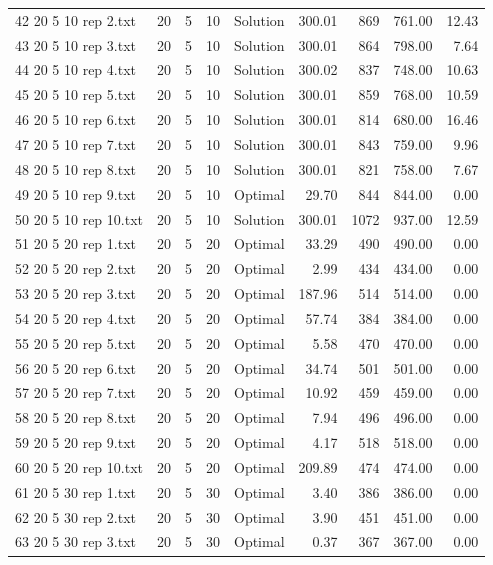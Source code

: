 \begin{longtable}{lrrllrrrr}
42 20 5 10 rep 2.txt & 20 & 5 & 10 & Solution & 300.01 & 869 & 761.00 & 12.43\\
43 20 5 10 rep 3.txt & 20 & 5 & 10 & Solution & 300.01 & 864 & 798.00 &  7.64\\
44 20 5 10 rep 4.txt & 20 & 5 & 10 & Solution & 300.02 & 837 & 748.00 & 10.63\\
45 20 5 10 rep 5.txt & 20 & 5 & 10 & Solution & 300.01 & 859 & 768.00 & 10.59\\
46 20 5 10 rep 6.txt & 20 & 5 & 10 & Solution & 300.01 & 814 & 680.00 & 16.46\\
47 20 5 10 rep 7.txt & 20 & 5 & 10 & Solution & 300.01 & 843 & 759.00 &  9.96\\
48 20 5 10 rep 8.txt & 20 & 5 & 10 & Solution & 300.01 & 821 & 758.00 &  7.67\\
49 20 5 10 rep 9.txt & 20 & 5 & 10 & Optimal & 29.70 & 844 & 844.00 &  0.00\\
50 20 5 10 rep 10.txt & 20 & 5 & 10 & Solution & 300.01 & 1072 & 937.00 & 12.59\\
51 20 5 20 rep 1.txt & 20 & 5 & 20 & Optimal & 33.29 & 490 & 490.00 &  0.00\\
52 20 5 20 rep 2.txt & 20 & 5 & 20 & Optimal &  2.99 & 434 & 434.00 &  0.00\\
53 20 5 20 rep 3.txt & 20 & 5 & 20 & Optimal & 187.96 & 514 & 514.00 &  0.00\\
54 20 5 20 rep 4.txt & 20 & 5 & 20 & Optimal & 57.74 & 384 & 384.00 &  0.00\\
55 20 5 20 rep 5.txt & 20 & 5 & 20 & Optimal &  5.58 & 470 & 470.00 &  0.00\\
56 20 5 20 rep 6.txt & 20 & 5 & 20 & Optimal & 34.74 & 501 & 501.00 &  0.00\\
57 20 5 20 rep 7.txt & 20 & 5 & 20 & Optimal & 10.92 & 459 & 459.00 &  0.00\\
58 20 5 20 rep 8.txt & 20 & 5 & 20 & Optimal &  7.94 & 496 & 496.00 &  0.00\\
59 20 5 20 rep 9.txt & 20 & 5 & 20 & Optimal &  4.17 & 518 & 518.00 &  0.00\\
60 20 5 20 rep 10.txt & 20 & 5 & 20 & Optimal & 209.89 & 474 & 474.00 &  0.00\\
61 20 5 30 rep 1.txt & 20 & 5 & 30 & Optimal &  3.40 & 386 & 386.00 &  0.00\\
62 20 5 30 rep 2.txt & 20 & 5 & 30 & Optimal &  3.90 & 451 & 451.00 &  0.00\\
63 20 5 30 rep 3.txt & 20 & 5 & 30 & Optimal &  0.37 & 367 & 367.00 &  0.00\\

\end{longtable}
